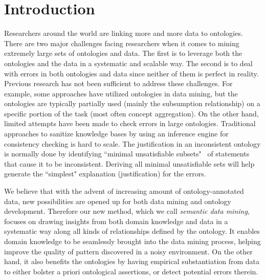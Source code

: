 \section{Introduction}
\label{sec:intro}
Researchers around the world are linking more and more data to ontologies. There are two major challenges facing researchers when it comes to mining extremely large sets of ontologies and data. The first is to leverage both the ontologies and the data in a systematic and scalable way. The second is to deal with errors in both ontologies and data since neither of them is perfect in reality. Previous research has not been sufficient to address these challenges. For example, some approaches have utilized ontologies in data mining, but the ontologies are typically partially used (mainly the subsumption relationship) on a specific portion of the task (most often concept aggregation). On the other hand, limited attempts have been made to check errors in large ontologies. Traditional approaches to sanitize knowledge bases by using an inference engine for consistency checking is hard to scale. The justification in an inconsistent ontology is normally done by identifying ``minimal unsatisfiable subsets"~\cite{BaileyS05,HorridgePS09} of statements that cause it to be inconsistent. Deriving all minimal unsatisfiable sets will help generate the ``simplest" explanation (justification) for the errors.

We believe that with the advent of increasing amount of ontology-annotated data, new possibilities are opened up for both data mining and ontology development. Therefore our new method, which we call \textit{semantic data mining}, focuses on drawing insights from both domain knowledge and data in a systematic way along all kinds of relationships defined by the ontology. It enables domain knowledge to be seamlessly brought into the data mining process, helping improve the quality of pattern discovered in a noisy environment. On the other hand, it also benefits the ontologies by having empirical substantiation from data to either bolster a priori ontological assertions, or detect potential errors therein.


